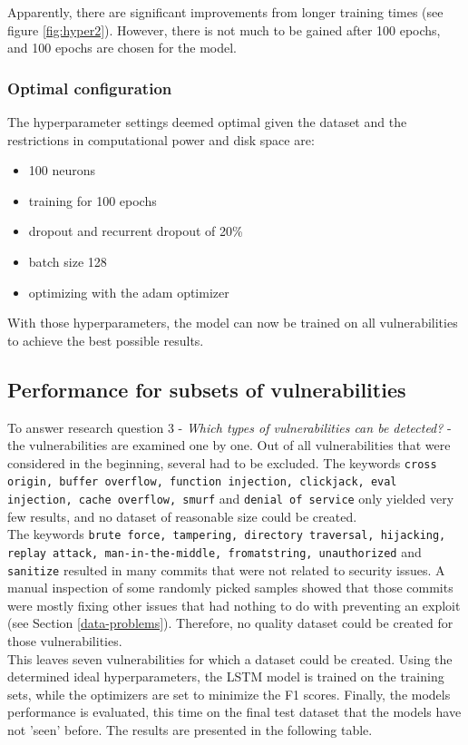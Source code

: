 \documentclass[
a4paper,
pagesize,
pdftex,
12pt,
twoside, %
BCOR=5mm, %
ngerman,
fleqn,
final,
]{scrartcl}
\begin{document}
	Apparently, there are significant improvements from longer training times (see figure \ref{fig:hyper2}). However, there is not much to be gained after 100 epochs, and 100 epochs are chosen for the model.
	
	\subsubsection{Optimal configuration}
	
	The hyperparameter settings deemed optimal given the dataset and the restrictions in computational power and disk space are:
	\begin{itemize}
		\item 100 neurons
		\item training for 100 epochs
		\item dropout and recurrent dropout of 20\%
		\item batch size 128
		\item optimizing with the adam optimizer
	\end{itemize}
	With those hyperparameters, the model can now be trained on all vulnerabilities to achieve the best possible results.
	
	
	
	\subsection{Performance for subsets of vulnerabilities}\label{vulnerabilities}
	
	To answer research question 3 - \textit{Which types of vulnerabilities can be detected?} - the vulnerabilities are examined one by one. Out of all vulnerabilities that were considered in the beginning, several had to be excluded. The keywords \texttt{cross origin, buffer overflow, function injection, clickjack, eval injection, cache overflow, smurf} and \texttt{denial of service} only yielded very few results, and no dataset of reasonable size could be created.\\
	The keywords \texttt{brute force, tampering, directory traversal, hijacking, replay attack, man-in-the-middle, fromatstring, unauthorized} and \texttt{sanitize} resulted in many commits that were not related to security issues. A manual inspection of some randomly picked samples showed that those commits were mostly fixing other issues that had nothing to do with preventing an exploit (see Section \ref{data-problems}). Therefore, no quality dataset could be created for those vulnerabilities.\\
	This leaves seven vulnerabilities for which a dataset could be created. Using the determined ideal hyperparameters, the LSTM model is trained on the training sets, while the optimizers are set to minimize the F1 scores. Finally, the models performance is evaluated, this time on the final test dataset that the models have not 'seen' before. The results are presented in the following table. 
	
\end{document}
